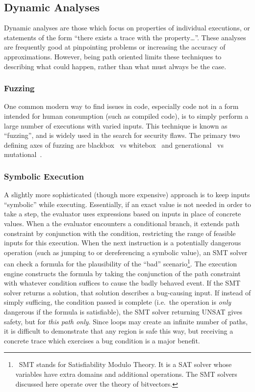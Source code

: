 \subsection{Dynamic Analyses}
Dynamic analyses are those which focus on properties of individual executions, or statements of the form ``there exists a trace with the property\ldots''.
These analyses are frequently good at pinpointing problems or increasing the accuracy of approximations.
However, being path oriented limits these techniques to describing what could happen, rather than what must always be the case.

\subsubsection{Fuzzing}
One common modern way to find issues in code, especially code not in a form intended for human consumption (such as compiled code), is to simply perform a large number of executions with varied inputs.
This technique is known as ``fuzzing'', and is widely used in the search for security flaws.
The primary two defining axes of fuzzing are blackbox~\cite{peach,zzuf,rebert2014} vs whitebox~\cite{klee,godefroid2008,avgerinos2014} and generational~\cite{peach} vs mutational~\cite{zzuf}.

\subsubsection{Symbolic Execution}
A slightly more sophisticated (though more expensive) approach is to keep inputs ``symbolic'' while executing.
Essentially, if an exact value is not needed in order to take a step, the evaluator uses expressions based on inputs in place of concrete values.
When a the evaluator encounters a conditional branch, it extends path constraint by conjunction with the condition, restricting the range of feasible inputs for this execution.
When the next instruction is a potentially dangerous operation (such as jumping to or dereferencing a symbolic value), an SMT solver can check a formula for the plausibility of the ``bad'' scenario\footnote{\
  SMT stands for Satisfiability Modulo Theory.
  It is a SAT solver whose variables have extra domains and additional operations.
  The SMT solvers discussed here operate over the theory of bitvectors.
}.
The execution engine constructs the formula by taking the conjunction of the path constraint with whatever condition suffices to cause the badly behaved event.
If the SMT solver returns a solution, that solution describes a bug-causing input\cite{aeg,mayhem}.
If instead of simply sufficing, the condition passed is complete (i.e.\ the operation is \emph{only} dangerous if the formula is satisfiable), the SMT solver returning UNSAT gives safety, but for \emph{this path only}.
Since loops may create an infinite number of paths, it is difficult to demonstrate that any region is safe this way, but receiving a concrete trace which exercises a bug condition is a major benefit.


